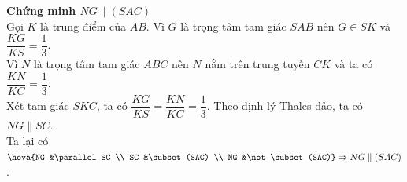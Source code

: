 \begin{vd}
{\begin{enumerate}
		\textbf{Chứng minh $NG \parallel (SAC)$}\\
		Gọi $K$ là trung điểm của $AB$. Vì $G$ là trọng tâm tam giác $SAB$ nên $G \in SK$ và $\dfrac{KG}{KS} = \dfrac{1}{3}$.\\
		Vì $N$ là trọng tâm tam giác $ABC$ nên $N$ nằm trên trung tuyến $CK$ và ta có $\dfrac{KN}{KC} = \dfrac{1}{3}$.\\
		Xét tam giác $SKC$, ta có $\dfrac{KG}{KS} = \dfrac{KN}{KC} = \dfrac{1}{3}$. Theo định lý Thales đảo, ta có $NG \parallel SC$.\\
		Ta lại có $\heva{NG &\parallel SC \\ SC &\subset (SAC) \\ NG &\not\subset (SAC)} \Rightarrow NG \parallel (SAC)$.
	\end{enumerate}
}
\end{vd}
\newpage
